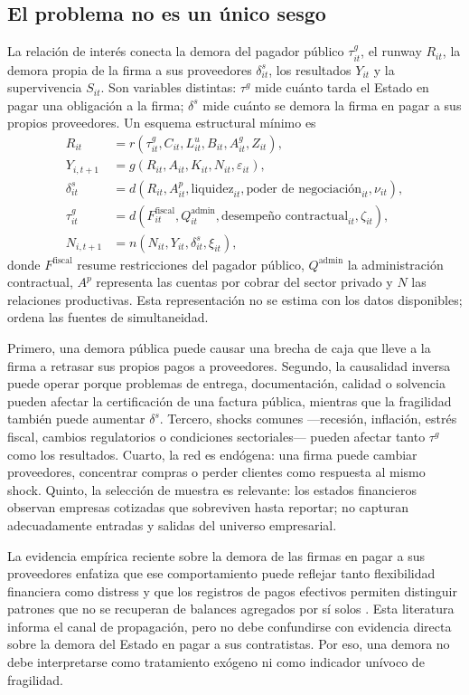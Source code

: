 \documentclass[11pt,a4paper]{article}
\begin{document}
\subsection{El problema no es un único sesgo}
La relación de interés conecta la demora del pagador público $\tau^g_{it}$, el runway $R_{it}$, la demora propia de la firma a sus proveedores $\delta^s_{it}$, los resultados $Y_{it}$ y la supervivencia $S_{it}$. Son variables distintas: $\tau^g$ mide cuánto tarda el Estado en pagar una obligación a la firma; $\delta^s$ mide cuánto se demora la firma en pagar a sus propios proveedores. Un esquema estructural mínimo es
\begin{align}
R_{it}&=r(\tau^g_{it},C_{it},L^u_{it},B_{it},A^g_{it},Z_{it}),\\
Y_{i,t+1}&=g(R_{it},A_{it},K_{it},N_{it},\varepsilon_{it}),\\
\delta^s_{it}&=d(R_{it},A^p_{it},\text{liquidez}_{it},\text{poder de negociación}_{it},\nu_{it}),\\
\tau^g_{it}&=d(F_{it}^{\mathrm{fiscal}},Q_{it}^{\mathrm{admin}},\text{desempeño contractual}_{it},\zeta_{it}),\\
N_{i,t+1}&=n(N_{it},Y_{it},\delta^s_{it},\xi_{it}),
\end{align}
donde $F^{\mathrm{fiscal}}$ resume restricciones del pagador público, $Q^{\mathrm{admin}}$ la administración contractual, $A^p$ representa las cuentas por cobrar del sector privado y $N$ las relaciones productivas. Esta representación no se estima con los datos disponibles; ordena las fuentes de simultaneidad.

Primero, una demora pública puede causar una brecha de caja que lleve a la firma a retrasar sus propios pagos a proveedores. Segundo, la causalidad inversa puede operar porque problemas de entrega, documentación, calidad o solvencia pueden afectar la certificación de una factura pública, mientras que la fragilidad también puede aumentar $\delta^s$. Tercero, shocks comunes —recesión, inflación, estrés fiscal, cambios regulatorios o condiciones sectoriales— pueden afectar tanto $\tau^g$ como los resultados. Cuarto, la red es endógena: una firma puede cambiar proveedores, concentrar compras o perder clientes como respuesta al mismo shock. Quinto, la selección de muestra es relevante: los estados financieros observan empresas cotizadas que sobreviven hasta reportar; no capturan adecuadamente entradas y salidas del universo empresarial.

La evidencia empírica reciente sobre la demora de las firmas en pagar a sus proveedores enfatiza que ese comportamiento puede reflejar tanto flexibilidad financiera como distress y que los registros de pagos efectivos permiten distinguir patrones que no se recuperan de balances agregados por sí solos \citep{wu2026,hirshleifer2019}. Esta literatura informa el canal de propagación, pero no debe confundirse con evidencia directa sobre la demora del Estado en pagar a sus contratistas. Por eso, una demora no debe interpretarse como tratamiento exógeno ni como indicador unívoco de fragilidad.
\end{document}
